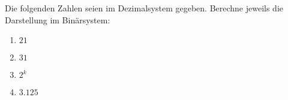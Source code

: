 \begin{exercise}[Binärsystem]
  Die folgenden Zahlen seien im Dezimalsystem gegeben. Berechne jeweils die
  Darstellung im Binärsystem:
  \begin{enumerate}
  \item $21$
  \item $31$
  \item $2^k$
  \item $3.125$
  \end{enumerate}
\end{exercise}
